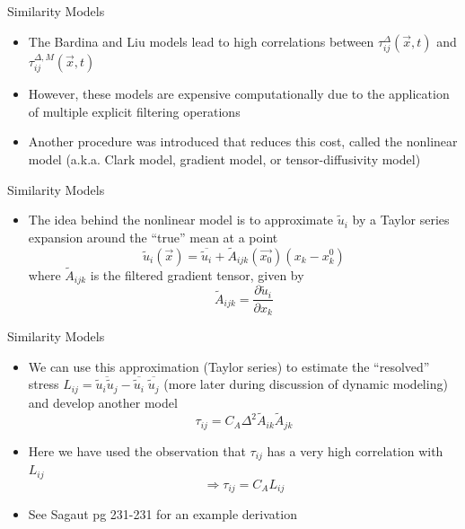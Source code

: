 \begin{frame}{Similarity Models}
\begin{itemize}
	\item The Bardina and Liu models lead to high correlations between $\tau_{ij}^{\Delta}(\vec{x},t)$ and $\tau_{ij}^{\Delta,M}(\vec{x},t)$
	\item However, these models are expensive computationally due to the application of multiple explicit filtering operations
	\item Another procedure was introduced that reduces this cost, called the nonlinear model (a.k.a. Clark model, gradient model, or tensor-diffusivity model)
\end{itemize}

\end{frame}


\begin{frame}{Similarity Models}
\begin{itemize}
	\item The idea behind the nonlinear model is to approximate $\widetilde{u}_i$ by a Taylor series expansion around the ``true'' mean at a point
	$$\widetilde{u}_i(\vec{x}) = \overline{\widetilde{u}_i} + \widetilde{A}_{ijk}(\vec{x_0})(x_k - x_k^0)$$
	where $\widetilde{A}_{ijk}$ is the filtered gradient tensor, given by
	$$\widetilde{A}_{ijk}=\frac{\partial \widetilde{u}_i}{\partial x_k}$$
\end{itemize}

\end{frame}


\begin{frame}{Similarity Models}
\begin{itemize}
	\item We can use this approximation (Taylor series) to estimate the ``resolved'' stress $L_{ij} = \overline{\widetilde{u}_i \widetilde{u}_j} - \overline{\widetilde{u}_i}\;\overline{\widetilde{u}_j}$ (more later during discussion of dynamic modeling) and develop another model
	$$\boxed{\tau_{ij} = C_A \Delta^2 \widetilde{A}_{ik}\widetilde{A}_{jk}}$$
	\item Here we have used the observation that $\tau_{ij}$ has a very high correlation with $L_{ij}$
	$$\Rightarrow \tau_{ij} = C_A L_{ij}$$
	\item See Sagaut pg 231-231 for an example derivation
\end{itemize}

\end{frame}

